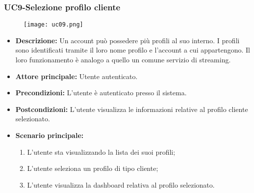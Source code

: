 \subsubsection{UC9-Selezione profilo cliente}
\begin{figure}[h] \texttt{[image: uc09.png]} \end{figure} 
\begin{itemize}
\item \textbf{Descrizione:} Un account può possedere più profili al suo interno. I profili sono identificati tramite il loro nome profilo e l'account a cui appartengono. Il loro funzionamento è analogo a quello un comune servizio di streaming. %
\item \textbf{Attore principale:} Utente autenticato.
\item \textbf{Precondizioni:} L'utente è autenticato presso il sistema.
\item \textbf{Postcondizioni:} L'utente visualizza le informazioni relative al profilo cliente selezionato.
\item \textbf{Scenario principale:}
\begin{enumerate}
    \item L'utente sta visualizzando la lista dei suoi profili;
    \item L'utente seleziona un profilo di tipo cliente;
    \item L'utente visualizza la dashboard relativa al profilo selezionato.
\end{enumerate}
\end{itemize}

\pagebreak
